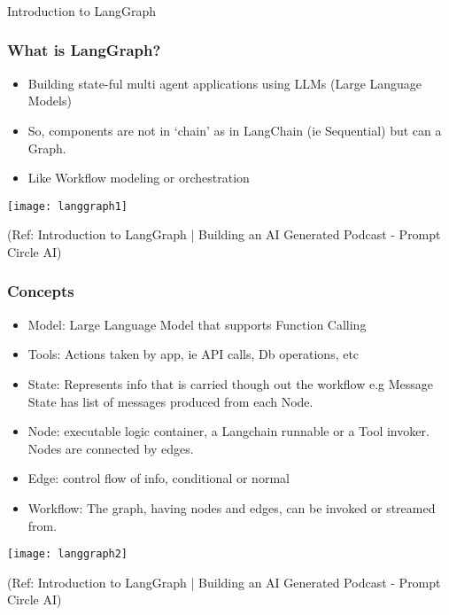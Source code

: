 \begin{frame}[fragile]\frametitle{}
\begin{center}
{\Large Introduction to LangGraph}
\end{center}
\end{frame}

\begin{frame}\frametitle{What is LangGraph?}

\begin{itemize}
\item Building state-ful multi agent applications using LLMs (Large Language Models)
\item So, components are not in `chain' as in LangChain (ie Sequential) but can a Graph.
\item Like Workflow modeling or orchestration
\end{itemize}

\begin{center}
\texttt{[image: langgraph1]}
\end{center}	  


{\tiny (Ref: Introduction to LangGraph | Building an AI Generated Podcast - Prompt Circle AI)}
\end{frame}

\begin{frame}\frametitle{Concepts}

\begin{itemize}
\item Model: Large Language Model that supports Function Calling
\item Tools: Actions taken by app, ie API calls, Db operations, etc
\item State: Represents info that is carried though out the workflow e.g Message State has list of messages produced from each Node.
\item Node: executable logic container, a Langchain runnable or a Tool invoker. Nodes are connected by edges.
\item Edge: control flow of info, conditional or normal
\item Workflow: The graph, having nodes and edges, can be invoked or streamed from.
\end{itemize}

\begin{center}
\texttt{[image: langgraph2]}
\end{center}	  

{\tiny (Ref: Introduction to LangGraph | Building an AI Generated Podcast - Prompt Circle AI)}
\end{frame}

